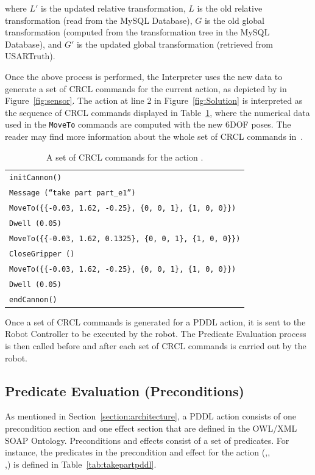 where $L'$ is the updated relative transformation, $L$ is the old relative transformation (read from the \textsf{MySQL Database}), $G$ is the old global transformation (computed from the transformation tree in the \textsf{MySQL Database}), and $G'$ is the updated global transformation (retrieved from USARTruth).

Once the above process is performed, the \textsf{Interpreter} uses the new data to generate a set of CRCL commands for the current action, as depicted by  in Figure~\ref{fig:sensor}. The  action at line 2 in Figure~\ref{fig:Solution} is interpreted as the sequence of CRCL commands displayed in Table~\ref{tab:takepart}, where the numerical data used in the \texttt{MoveTo} commands are computed with the new 6DOF poses. The reader may find more information about the whole set of CRCL commands in~\cite{Balakirsky2012-1}.

\begin{table}[h!]

\caption{A set of CRCL commands for the action .}
\centering
  \begin{tabular}{l}
    \hline
    \texttt{initCannon()}\\
    \texttt{Message (``take part part\_e1'')}\\
    \texttt{MoveTo(\{\{-0.03, 1.62, -0.25\}, \{0, 0, 1\}, \{1, 0, 0\}\})}\\
    \texttt{Dwell (0.05)}\\
    \texttt{MoveTo(\{\{-0.03, 1.62, 0.1325\}, \{0, 0, 1\}, \{1, 0, 0\}\})} \\
    \texttt{CloseGripper ()} \\
    \texttt{MoveTo(\{\{-0.03, 1.62, -0.25\}, \{0, 0, 1\}, \{1, 0, 0\}\})}\\
    \texttt{Dwell (0.05)}\\
    \texttt{endCannon()}\\
    \hline
  \end{tabular}
  \label{tab:takepart}
\end{table}

Once a set of CRCL commands is generated for a PDDL action, it is sent to the \textsf{Robot Controller} to be executed by the robot. The \textsf{Predicate Evaluation} process is then called before and after each set of CRCL commands is carried out by the robot.

\subsection{Predicate Evaluation (Preconditions)}
As mentioned in Section~\ref{section:architecture}, a PDDL action consists of one precondition section and one effect section that are defined in the \textsf{OWL/XML SOAP Ontology}. Preconditions and effects consist of a set of predicates. For instance, the predicates in the precondition and effect for the action (,,\\,) is defined in Table~\ref{tab:takepartpddl}.



